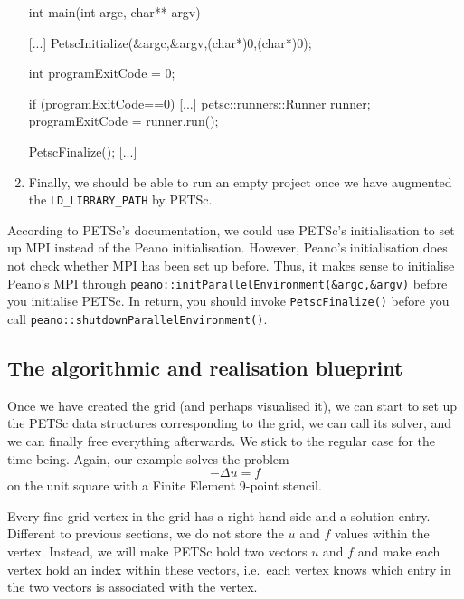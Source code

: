 \begin{enumerate}
\begin{code}
[...]

int main(int argc, char** argv) {
  [...]
  PetscInitialize(&argc,&argv,(char*)0,(char*)0);

  int programExitCode = 0;

  if (programExitCode==0) {
    [...]
    petsc::runners::Runner runner;
    programExitCode = runner.run();
  }

  PetscFinalize();
  [...]
}  
  \end{code}
  \item Finally, we should be able to run an empty project once we have
  augmented the \texttt{LD\_LIBRARY\_PATH} by PETSc.
\end{enumerate}
  

\begin{remark}
   According to PETSc's documentation, we could use PETSc's initialisation to
   set up MPI instead of the Peano initialisation. However, Peano's
   initialisation does not check whether MPI has been set up before. 
   Thus, it makes sense to initialise Peano's MPI through
   \texttt{peano::initParallelEnvironment(\&argc,\&argv)} before you initialise
   PETSc. In return, you should invoke \texttt{PetscFinalize()} before you call
   \texttt{peano::shutdownParallelEnvironment()}.
\end{remark}




\subsection{The algorithmic and realisation blueprint}

Once we have created the grid (and perhaps visualised it), we can start to set
up the PETSc data structures corresponding to the grid, we can call its solver,
and we can finally free everything afterwards.
We stick to the regular case for the time being.
Again, our example solves the problem
\[
-\Delta u = f
\]
on the unit square with a Finite Element 9-point stencil.


Every fine grid vertex in the grid has a right-hand side and a solution entry. 
Different to previous sections, we do not store the $u$ and $f$ values within
the vertex.
Instead, we will make PETSc hold two vectors $u$ and $f$ and
make each vertex hold an index within these vectors, i.e.~each vertex knows
which entry in the two vectors is associated with the vertex.


